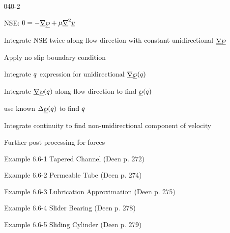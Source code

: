 \begin{mitframe}{040-2}

                
\begin{listone}
\item NSE: $0=-\gradop\uline{\dynpress}+\chempot\gradop^2\uline{\vvel}$

			\begin{listtwo}
            \item Integrate NSE twice along flow direction with constant unidirectional $\uline{\gradop}\uline{\dynpress}$
            
            \item Apply no slip boundary condition
            
            \item Integrate $\heatflux$ expression for unidirectional $\gradop\uline{\dynpress}(\heatflux)$
            
            \item Integrate $\gradop\uline{\dynpress}(\heatflux)$ along flow direction to find $\uline{\dynpress}(\heatflux)$
            
            \item use known $\iipf\uline{\dynpress}(\heatflux)$ to find $\heatflux$
            
            \item Integrate continuity to find non-unidirectional component of velocity
            
            \item Further post-processing for forces
                       
\end{listtwo}

\item Example 6.6-1 Tapered Channel (Deen p. 272)
\item Example 6.6-2 Permeable Tube (Deen p. 274)
\item Example 6.6-3 Lubrication Approximation (Deen p. 275)
\item Example 6.6-4 Slider Bearing (Deen p. 278)
\item Example 6.6-5 Sliding Cylinder (Deen p. 279)

\end{listone}
\end{mitframe}